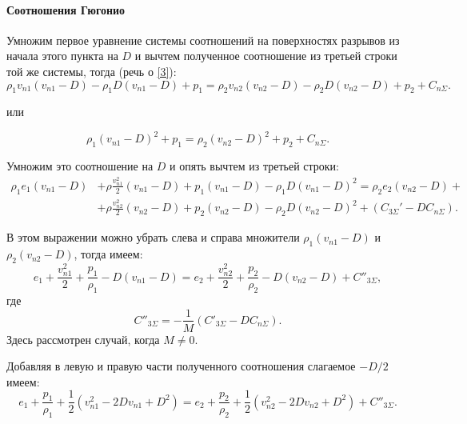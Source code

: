 \paragraph{Соотношения Гюгонио}

Умножим первое уравнение системы соотношений на поверхностях разрывов из начала этого пункта на $D$ и вычтем полученное соотношение из третьей строки той же системы, тогда (речь о \ref{3}):
\begin{equation*}
	\rho_1 v_{n1} \left(v_{n1} - D\right) - \rho_1 D \left(v_{n1} - D\right) + p_1 = \rho_2 v_{n2} (v_{n2} - D) - \rho_2 D \left(v_{n2} - D\right) + p_2 + C_{n\Sigma}.
\end{equation*} 

или

\begin{equation*}
	\rho_1 \left(v_{n1} - D\right)^2 + p_1 = \rho_2 \left(v_{n2} - D\right)^2 + p_2 + C_{n\Sigma}.
\end{equation*}

Умножим это соотношение на $D$ и опять вычтем из третьей строки:
\begin{align*}
	\rho_1 e_1 \left(v_{n1} - D\right) &+ \rho \frac{v_{n1}^2}{2} \left(v_{n1} - D\right) + p_1(v_{n1} - D) - \rho_1 D \left(v_{n1} - D\right)^2 = \rho_2 e_2 (v_{n2} - D) + \\
	&+ \rho \frac{v^2_{n2}}{2} \left(v_{n2} - D\right) + p_2 \left(v_{n2} - D\right) - \rho_2 D \left(v_{n2} - D\right)^2 + \left(C_{3\Sigma}' - D C_{n\Sigma}\right).
\end{align*}

В этом выражении можно убрать слева и справа множители $\rho_1 \left(v_{n1} - D\right)$ и $\rho_2 \left(v_{n2} - D\right)$, тогда имеем:
\begin{equation*}
	e_1 + \frac{v^2_{n1}}{2} + \frac{p_1}{\rho_1} - D \left(v_{n1} - D\right) = e_2 + \frac{v^2_{n2}}{2} + \frac{p_2}{\rho_2} - D \left(v_{n2} - D\right) + C''_{3\Sigma},
\end{equation*}
где 
\begin{equation*}
	C''_{3\Sigma} = - \frac{1}{M} \left(C'_{3\Sigma} - D C_{n\Sigma}\right).
\end{equation*}
Здесь рассмотрен случай, когда $M \not = 0$.

Добавляя в левую и правую части полученного соотношения слагаемое $-D/2$ имеем:
\begin{equation*}
	e_1 + \frac{p_1}{\rho_1} + \frac{1}{2} \left(v^2_{n1} - 2Dv_{n1} + D^2\right) = e_2 + \frac{p_2}{\rho_2} + \frac{1}{2} \left(v_{n2}^2 - 2 D v_{n2} + D^2\right) + C''_{3\Sigma}.
\end{equation*}

